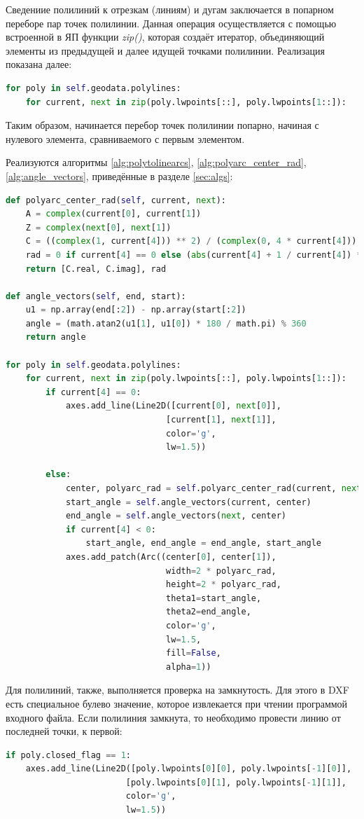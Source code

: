 Сведениие полилиний к отрезкам (линиям) и дугам заключается в попарном переборе пар точек полилинии. Данная операция осуществляется с помощью встроенной в ЯП функции \textit{zip()}, которая создаёт итератор, объединяющий элементы из предыдущей и далее идущей точками полилинии. Реализация показана далее:
\begin{lstlisting}[language=python,label=list:redraw]
for poly in self.geodata.polylines:
	for current, next in zip(poly.lwpoints[::], poly.lwpoints[1::]):
\end{lstlisting}

Таким образом, начинается перебор точек полилинии попарно, начиная с нулевого элемента, сравниваемого с первым элементом.

Реализуются алгоритмы \ref{alg:polytolinearcs}, \ref{alg:polyarc_center_rad}, \ref{alg:angle_vectors}, приведённые в разделе \ref{sec:algs}:
\begin{lstlisting}[language=python,label=list:sketch]
def polyarc_center_rad(self, current, next):
	A = complex(current[0], current[1])
	Z = complex(next[0], next[1])
	C = ((complex(1, current[4])) ** 2) / (complex(0, 4 * current[4])) * A - ((complex(1, -current[4])) ** 2) / (complex(0, 4 * current[4])) * Z
	rad = 0 if current[4] == 0 else (abs(current[4] + 1 / current[4]) * math.sqrt((next[0] - current[0]) ** 2 + (next[1] - current[1]) ** 2) / 4)
	return [C.real, C.imag], rad

def angle_vectors(self, end, start):
	u1 = np.array(end[:2]) - np.array(start[:2])
	angle = (math.atan2(u1[1], u1[0]) * 180 / math.pi) % 360
	return angle

for poly in self.geodata.polylines:
	for current, next in zip(poly.lwpoints[::], poly.lwpoints[1::]):
		if current[4] == 0:
			axes.add_line(Line2D([current[0], next[0]],
								[current[1], next[1]],
								color='g',
								lw=1.5))

		else:
			center, polyarc_rad = self.polyarc_center_rad(current, next)
			start_angle = self.angle_vectors(current, center)
			end_angle = self.angle_vectors(next, center)
			if current[4] < 0:
				start_angle, end_angle = end_angle, start_angle
			axes.add_patch(Arc((center[0], center[1]),
								width=2 * polyarc_rad,
								height=2 * polyarc_rad,
								theta1=start_angle,
								theta2=end_angle,
								color='g',
								lw=1.5,
								fill=False,
								alpha=1))
\end{lstlisting}

Для полилиний, также, выполняется проверка на замкнутость.  Для этого в DXF есть специальное булево значение, которое извлекается при чтении программой входного файла. Если полилиния замкнута, то необходимо провести линию от последней точки, к первой:
\begin{lstlisting}[language=python,label=list:closedflag]
if poly.closed_flag == 1:
	axes.add_line(Line2D([poly.lwpoints[0][0], poly.lwpoints[-1][0]],
						[poly.lwpoints[0][1], poly.lwpoints[-1][1]],
						color='g',
						lw=1.5))
\end{lstlisting}

